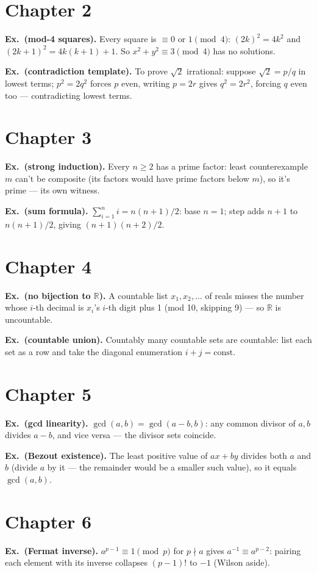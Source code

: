 \section*{Chapter 2}
\textbf{Ex.~(mod-4 squares).} Every square is $\equiv0$ or
$1\pmod4$: $(2k)^2=4k^2$ and $(2k+1)^2=4k(k+1)+1$. So $x^2+y^2\equiv3
\pmod4$ has no solutions.

\textbf{Ex.~(contradiction template).} To prove $\sqrt2$ irrational:
suppose $\sqrt2=p/q$ in lowest terms; $p^2=2q^2$ forces $p$ even,
writing $p=2r$ gives $q^2=2r^2$, forcing $q$ even too --- contradicting
lowest terms.

\section*{Chapter 3}
\textbf{Ex.~(strong induction).} Every $n\ge2$ has a prime factor:
least counterexample $m$ can't be composite (its factors would have
prime factors below $m$), so it's prime --- its own witness.

\textbf{Ex.~(sum formula).} $\sum_{i=1}^n i = n(n+1)/2$: base $n=1$;
step adds $n+1$ to $n(n+1)/2$, giving $(n+1)(n+2)/2$.

\section*{Chapter 4}
\textbf{Ex.~(no bijection to $\mathbb R$).} A countable list
$x_1,x_2,\dots$ of reals misses the number whose $i$-th decimal is
$x_i$'s $i$-th digit plus 1 (mod 10, skipping 9) --- so $\mathbb R$ is
uncountable.

\textbf{Ex.~(countable union).} Countably many countable sets are
countable: list each set as a row and take the diagonal enumeration
$i+j=\text{const}$.

\section*{Chapter 5}
\textbf{Ex.~(gcd linearity).} $\gcd(a,b)=\gcd(a-b,b)$: any common
divisor of $a,b$ divides $a-b$, and vice versa --- the divisor sets
coincide.

\textbf{Ex.~(Bezout existence).} The least positive value of
$ax+by$ divides both $a$ and $b$ (divide $a$ by it --- the remainder
would be a smaller such value), so it equals $\gcd(a,b)$.

\section*{Chapter 6}
\textbf{Ex.~(Fermat inverse).} $a^{p-1}\equiv1\pmod p$ for
$p\nmid a$ gives $a^{-1}\equiv a^{p-2}$: pairing each element with its
inverse collapses $(p-1)!$ to $-1$ (Wilson aside).

